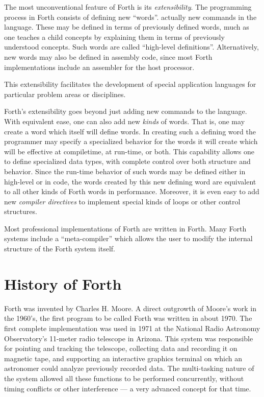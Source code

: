 The most unconventional feature of Forth is its \emph{extensibility}.
The programming process in Forth consists of defining new ``words''.
actually new commands in the language. These may be defined in terms
of previously defined words, much as one teaches a child concepts by
explaining them in terms of previously understood concepts. Such
words are called ``high-level definitions''. Alternatively, new
words may also be defined in assembly code, since most Forth
implementations include an assembler for the host processor.

This extensibility facilitates the development of special application
languages for particular problem areas or disciplines.

Forth's extensibility goes beyond just adding new commands to the
language. With equivalent ease, one can also add new \emph{kinds} of
words. That is, one may create a word which itself will define
words. In creating such a defining word the programmer may specify
a specialized behavior for the words it will create which will be
effective at compiletime, at run-time, or both. This capability
allows one to define specialized data types, with complete control
over both structure and behavior. Since the run-time behavior of
such words may be defined either in high-level or in code, the words
created by this new defining word are equivalent to all other kinds
of Forth words in performance. Moreover, it is even easy to add new
\emph{compiler directives} to implement special kinds of loops or
other control structures.

Most professional implementations of Forth are written in Forth.
Many Forth systems include a ``meta-compiler'' which allows the user
to modify the internal structure of the Forth system itself.


\section{History of Forth} %

Forth was invented by Charles H. Moore. A direct outgrowth of Moore's
work in the 1960's, the first program to be called Forth was written
in about 1970. The first complete implementation was used in 1971 at
the National Radio Astronomy Observatory's 11-meter radio telescope
in Arizona. This system was responsible for pointing and tracking the
telescope, collecting data and recording it on magnetic tape, and
supporting an interactive graphics terminal on which an astronomer
could analyze previously recorded data. The multi-tasking nature of
the system allowed all these functions to be performed concurrently,
without timing conflicts or other interference --- a very advanced
concept for that time.

